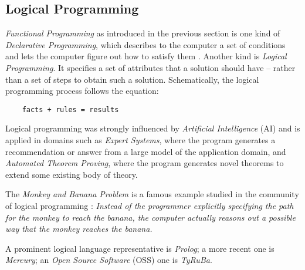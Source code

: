 %
%
%
%
%
%
%

\subsection{Logical Programming}
\label{logical_programming_heading}

\emph{Functional Programming} as introduced in the previous section is one kind
of \emph{Declarative Programming}, which describes to the computer a set of
conditions and lets the computer figure out how to satisfy them \cite{wikipedia}.
Another kind is \emph{Logical Programming}. It specifies a set of attributes
that a solution should have -- rather than a set of steps to obtain such a
solution. Schematically, the logical programming process follows the equation:

\begin{scriptsize}
    \begin{verbatim}
    facts + rules = results
    \end{verbatim}
\end{scriptsize}

Logical programming was strongly influenced by \emph{Artificial Intelligence}
(AI) and is applied in domains such as \emph{Expert Systems}, where the program
generates a recommendation or answer from a large model of the application
domain, and \emph{Automated Theorem Proving}, where the program generates novel
theorems to extend some existing body of theory. \cite{wikipedia}

The \emph{Monkey and Banana Problem} is a famous example studied in the community
of logical programming \cite{wikipedia}: \textit{Instead of the programmer
explicitly specifying the path for the monkey to reach the banana, the computer
actually reasons out a possible way that the monkey reaches the banana.}

A prominent logical language representative is \emph{Prolog}; a more recent one
is \emph{Mercury}; an \emph{Open Source Software} (OSS) one is \emph{TyRuBa}.
